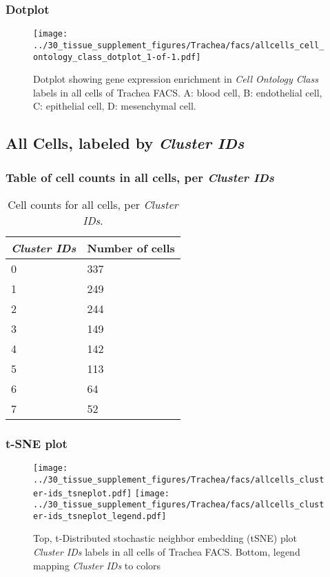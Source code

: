 \clearpage

\subsubsection{Dotplot}
\begin{figure}[h]
\centering
\texttt{[image: ../30\_tissue\_supplement\_figures/Trachea/facs/allcells\_cell\_ontology\_class\_dotplot\_1-of-1.pdf]}

\caption{ Dotplot  showing gene expression enrichment in \emph{Cell Ontology Class} labels in all cells of Trachea FACS. A: blood cell, B: endothelial cell, C: epithelial cell, D: mesenchymal cell.}
\end{figure}


\clearpage

\subsection{All Cells, labeled by \emph{Cluster IDs}}
\subsubsection{Table of cell counts in all cells, per \emph{Cluster IDs}}\begin{table}[h]
\centering
\label{my-label}
\begin{tabular}{@{}ll@{}}
\toprule

\emph{Cluster IDs}& Number of cells \\ \midrule
0 & 337 \\

1 & 249 \\

2 & 244 \\

3 & 149 \\

4 & 142 \\

5 & 113 \\

6 & 64 \\

7 & 52 \\
\bottomrule
\end{tabular}
\caption{Cell counts for all cells, per \emph{Cluster IDs}.}
\end{table}

\clearpage
\subsubsection{t-SNE plot}
\begin{figure}[h]
\centering
\texttt{[image: ../30\_tissue\_supplement\_figures/Trachea/facs/allcells\_cluster-ids\_tsneplot.pdf]}
\texttt{[image: ../30\_tissue\_supplement\_figures/Trachea/facs/allcells\_cluster-ids\_tsneplot\_legend.pdf]}
\caption{Top, t-Distributed stochastic neighbor embedding (tSNE) plot  \emph{Cluster IDs} labels in all cells of Trachea FACS. Bottom, legend mapping \emph{Cluster IDs} to colors}
\end{figure}


